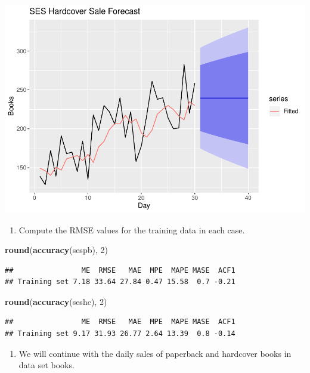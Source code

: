 \documentclass[]{article}
\newenvironment{Shaded}{\begin{snugshade}}{\end{snugshade}}
\newcommand{\KeywordTok}[1]{\textcolor[rgb]{0.13,0.29,0.53}{\textbf{#1}}}
\newcommand{\DecValTok}[1]{\textcolor[rgb]{0.00,0.00,0.81}{#1}}
\newcommand{\NormalTok}[1]{#1}
\providecommand{\tightlist}{%
  \setlength{\itemsep}{0pt}\setlength{\parskip}{0pt}}
\begin{document}
\includegraphics{Hw4_files/figure-latex/unnamed-chunk-6-2.pdf}

\begin{enumerate}
\def\labelenumi{\alph{enumi})}
\setcounter{enumi}{2}
\tightlist
\item
  Compute the RMSE values for the training data in each case.
\end{enumerate}

\begin{Shaded}
\begin{Highlighting}[]
\KeywordTok{round}\NormalTok{(}\KeywordTok{accuracy}\NormalTok{(sespb), }\DecValTok{2}\NormalTok{)}
\end{Highlighting}
\end{Shaded}

\begin{verbatim}
##                ME  RMSE   MAE  MPE  MAPE MASE  ACF1
## Training set 7.18 33.64 27.84 0.47 15.58  0.7 -0.21
\end{verbatim}

\begin{Shaded}
\begin{Highlighting}[]
\KeywordTok{round}\NormalTok{(}\KeywordTok{accuracy}\NormalTok{(seshc), }\DecValTok{2}\NormalTok{)}
\end{Highlighting}
\end{Shaded}

\begin{verbatim}
##                ME  RMSE   MAE  MPE  MAPE MASE  ACF1
## Training set 9.17 31.93 26.77 2.64 13.39  0.8 -0.14
\end{verbatim}

\begin{enumerate}
\def\labelenumi{\arabic{enumi}.}
\setcounter{enumi}{5}
\tightlist
\item
  We will continue with the daily sales of paperback and hardcover books
  in data set books.
\end{enumerate}
\end{document}
